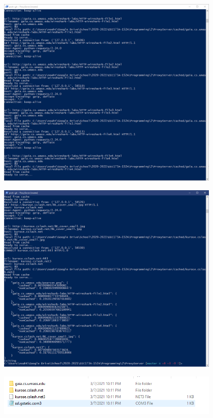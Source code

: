 \documentclass[11pt]{article}
\begin{document}
\begin{center}
  \item \includegraphics[width=0.8\textwidth]{img/proxy_server_terminal.PNG}
  \item \includegraphics[width=0.8\textwidth]{img/proxy_server_terminal_on_exit.PNG}
  \break
  \item \includegraphics[width=0.8\textwidth]{img/local_cached_directory.PNG}

\end{center}
\end{document}
